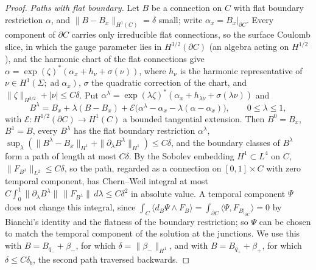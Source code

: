 \documentclass[11pt]{amsart}
\theoremstyle{definition}
\theoremstyle{remark}
\theoremstyle{plain}
\numberwithin{equation}{section}
\newcommand{\ad}{\operatorname{ad}}
\begin{document}
\begin{proof}
\emph{Paths with flat boundary.} Let $B$ be a connection on $C$ with flat boundary restriction
$\alpha$, and $\|B-B_x\|_{H^1(C)}=\delta$ small; write $\alpha_x=B_x|_{\partial C}$. Every
component of $\partial C$ carries only irreducible flat connections, so the surface Coulomb
slice, in which the gauge parameter lies in $H^{3/2}(\partial C)$ (an algebra acting on
$H^{1/2}$), and the harmonic chart of the flat connections give
$\alpha=\exp(\zeta)^*(\alpha_x+h_\nu+\sigma(\nu))$, where $h_\nu$ is the harmonic representative
of $\nu\in H^1(\Sigma;\ad\alpha_x)$, $\sigma$ the quadratic correction of the chart, and
$\|\zeta\|_{H^{3/2}}+|\nu|\le C\delta$. Put
$\alpha^\lambda=\exp(\lambda\zeta)^*(\alpha_x+h_{\lambda\nu}+\sigma(\lambda\nu))$ and
\[
B^\lambda=B_x+\lambda(B-B_x)+\mathcal E\bigl(\alpha^\lambda-\alpha_x-\lambda(\alpha-\alpha_x)\bigr),
\qquad0\le\lambda\le1,
\]
with $\mathcal E\colon H^{1/2}(\partial C)\to H^1(C)$ a bounded tangential extension. Then
$B^0=B_x$, $B^1=B$, every $B^\lambda$ has the flat boundary restriction $\alpha^\lambda$,
$\sup_\lambda(\|B^\lambda-B_x\|_{H^1}+\|\partial_\lambda B^\lambda\|_{H^1})\le C\delta$, and the
boundary classes of $B^\lambda$ form a path of length at most $C\delta$. By the Sobolev
embedding $H^1\subset L^4$ on $C$, $\|F_{B^\lambda}\|_{L^2}\le C\delta$, so the path, regarded as
a connection on $[0,1]\times C$ with zero temporal component, has Chern--Weil integral at most
$C\int_0^1\|\partial_\lambda B^\lambda\|\,\|F_{B^\lambda}\|\,d\lambda\le C\delta^2$ in absolute
value. A temporal component $\Psi$ does not change this integral, since
$\int_C\langle d_B\Psi\wedge F_B\rangle=\int_{\partial C}\langle\Psi,F_{B|_{\partial C}}\rangle=0$
by Bianchi's identity and the flatness of the boundary restriction; so $\Psi$ can be chosen to
match the temporal component of the solution at the junctions. We use this with
$B=B_{q_-}+\beta_-$, for which $\delta=\|\beta_-\|_{H^1}$, and with $B=B_{q_+}+\beta_+$, for which
$\delta\le C\delta_b$, the second path traversed backwards.


\end{proof}
\end{document}
